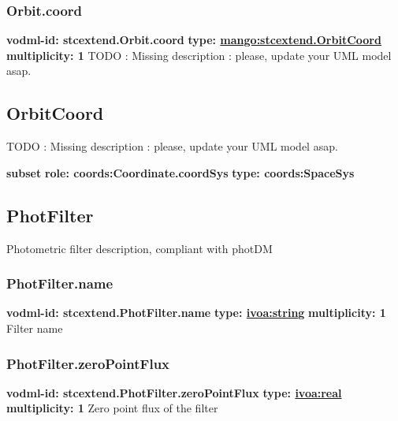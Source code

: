     \subsubsection{Orbit.coord}
      \textbf{vodml-id: stcextend.Orbit.coord} \newline
      \textbf{type: \hyperref[sect:stcextend.OrbitCoord]{mango:stcextend.OrbitCoord}} \newline
      \textbf{multiplicity: 1} \newline 
      TODO : Missing description : please, update your UML model asap.

  \subsection{OrbitCoord}
  \label{sect:stcextend.OrbitCoord}
    TODO : Missing description : please, update your UML model asap.

    \noindent \textbf{subset} \newline
    \indent   \textbf{role: coords:Coordinate.coordSys} \newline
    \indent   \textbf{type: coords:SpaceSys} \newline


  \subsection{PhotFilter}
  \label{sect:stcextend.PhotFilter}
    Photometric filter description, compliant with photDM

    \subsubsection{PhotFilter.name}
      \textbf{vodml-id: stcextend.PhotFilter.name} \newline
      \textbf{type: \hyperref[sect:ivoa]{ivoa:string}} \newline
      \textbf{multiplicity: 1} \newline 
      Filter name

    \subsubsection{PhotFilter.zeroPointFlux}
      \textbf{vodml-id: stcextend.PhotFilter.zeroPointFlux} \newline
      \textbf{type: \hyperref[sect:ivoa]{ivoa:real}} \newline
      \textbf{multiplicity: 1} \newline 
      Zero point flux of the filter

